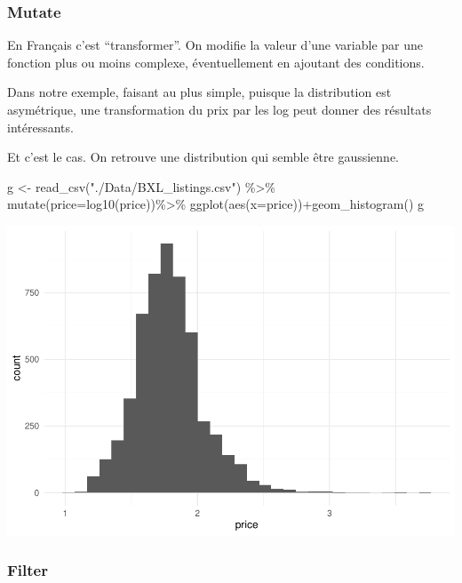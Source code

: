 \documentclass[
]{book}
\newenvironment{Shaded}{\begin{snugshade}}{\end{snugshade}}
\newcommand{\AttributeTok}[1]{\textcolor[rgb]{0.77,0.63,0.00}{#1}}
\newcommand{\FunctionTok}[1]{\textcolor[rgb]{0.00,0.00,0.00}{#1}}
\newcommand{\NormalTok}[1]{#1}
\newcommand{\OtherTok}[1]{\textcolor[rgb]{0.56,0.35,0.01}{#1}}
\newcommand{\SpecialCharTok}[1]{\textcolor[rgb]{0.00,0.00,0.00}{#1}}
\newcommand{\StringTok}[1]{\textcolor[rgb]{0.31,0.60,0.02}{#1}}
\begin{document}
\hypertarget{mutate}{%
\subsubsection{Mutate}\label{mutate}}

En Français c'est ``transformer''. On modifie la valeur d'une variable par une fonction plus ou moins complexe, éventuellement en ajoutant des conditions.

Dans notre exemple, faisant au plus simple, puisque la distribution est asymétrique, une transformation du prix par les log peut donner des résultats intéressants.

Et c'est le cas. On retrouve une distribution qui semble être gaussienne.

\begin{Shaded}
\begin{Highlighting}[]
\NormalTok{g }\OtherTok{\textless{}{-}} \FunctionTok{read\_csv}\NormalTok{(}\StringTok{"./Data/BXL\_listings.csv"}\NormalTok{) }\SpecialCharTok{\%\textgreater{}\%} 
  \FunctionTok{mutate}\NormalTok{(}\AttributeTok{price=}\FunctionTok{log10}\NormalTok{(price))}\SpecialCharTok{\%\textgreater{}\%}
  \FunctionTok{ggplot}\NormalTok{(}\FunctionTok{aes}\NormalTok{(}\AttributeTok{x=}\NormalTok{price))}\SpecialCharTok{+}\FunctionTok{geom\_histogram}\NormalTok{()}
\NormalTok{g}
\end{Highlighting}
\end{Shaded}

\includegraphics{bookdown-demo_files/figure-latex/0204-1.pdf}

\hypertarget{filter}{%
\subsubsection{Filter}\label{filter}}
\end{document}
